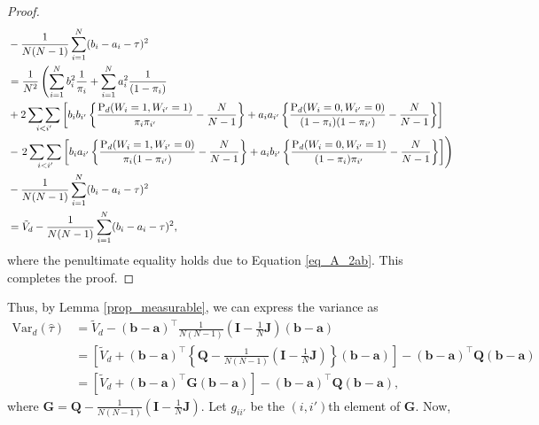 \documentclass[12pt]{article}
\newcommand{\Var}{{\text{Var}}}
\renewcommand{\Pr}{{\text{P}}}
\begin{document}
\begin{proof}
\begin{align}
& - \frac{1}{N(N-1)}\sum_{i=1}^{N}(b_i -a_i - \tau)^2 \nonumber \\
& = \frac{1}{N^2}\left(\sum_{i=1}^{N} b^2_i \frac{1}{\pi_i} + \sum_{i=1}^{N} a^2_i \frac{1}{(1-\pi_i)} \right.\nonumber \\
& + 2\mathop{\sum\sum}_{i<i'}\left[b_ib_{i'}\left\{\frac{\Pr_d(W_i = 1,W_{i'} = 1)}{\pi_i \pi_{i'}} - \frac{N}{N-1}\right\} + a_ia_{i'}\left\{\frac{\Pr_d(W_i = 0,W_{i'} = 0)}{(1-\pi_i) (1-\pi_{i'})} - \frac{N}{N-1} \right\} \right] \nonumber \\
& - \left. 2\mathop{\sum\sum}_{i<i'}\left[b_ia_{i'}\left\{\frac{\Pr_d(W_i = 1,W_{i'} = 0)}{\pi_i (1- \pi_{i'})} - \frac{N}{N-1}\right\} + a_ib_{i'}\left\{\frac{\Pr_d(W_i = 0,W_{i'} = 1)}{(1-\pi_i) \pi_{i'}} - \frac{N}{N-1} \right\} \right]\right) \nonumber\\
& - \frac{1}{N(N-1)}\sum_{i=1}^{N}(b_i -a_i - \tau)^2 \nonumber \\
& = \Tilde{V}_d - \frac{1}{N(N-1)}\sum_{i=1}^{N}(b_i -a_i - \tau)^2,
\end{align}
where the penultimate equality holds due to Equation \ref{eq_A_2ab}. This completes the proof. 
\end{proof}
Thus, by Lemma \ref{prop_measurable}, we can express the variance as
\begin{align}
\Var_d(\hat{\tau}) & = \tilde{V}_d - (\bm{b} - \bm{a})^\top \frac{1}{N(N-1)}(\bm{I} - \frac{1}{N}\bm{J}) (\bm{b} - \bm{a}) \nonumber\\
& = \left[\tilde{V}_d + (\bm{b} - \bm{a})^\top \left\{\bm{Q} - \frac{1}{N(N-1)}\left(\bm{I} - \frac{1}{N}\bm{J}\right)\right\}(\bm{b} - \bm{a})  \right] - (\bm{b} - \bm{a})^\top \bm{Q}(\bm{b} - \bm{a}) \nonumber \\
& = \left[\tilde{V}_d + (\bm{b} - \bm{a})^\top \bm{G}(\bm{b} - \bm{a})  \right] - (\bm{b} - \bm{a})^\top \bm{Q}(\bm{b} - \bm{a}),
\end{align}
where $\bm{G} = \bm{Q} - \frac{1}{N(N-1)}\left(\bm{I} - \frac{1}{N}\bm{J}\right)$. Let $g_{ii'}$ be the $(i,i')$th element of $\bm{G}$. 
Now, 
\end{document}
